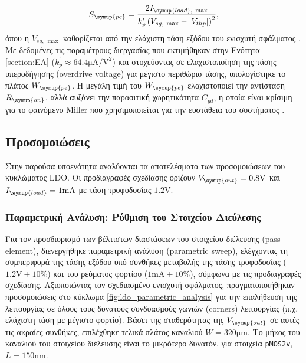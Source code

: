 \begin{equation}
    S_{\symup{pe}} = \frac{2 I_{\symup{load},\ \max}}{k_{p}^{\prime} \left(V_{sg,\ \max} - |V_{thp}|\right)^2},
\end{equation}
όπου η $V_{sg,\ \max}$ καθορίζεται από την ελάχιστη τάση εξόδου του ενισχυτή σφάλματος \cite{RazaviCMOS}. Με δεδομένες τις παραμέτρους διεργασίας που εκτιμήθηκαν στην Ενότητα \ref{section:EA} ($k_{p}^{\prime} \approx 64.4\unit{\micro\ampere\per\volt\squared}$) και στοχεύοντας σε ελαχιστοποίηση της τάσης υπεροδήγησης (overdrive voltage) για μέγιστο περιθώριο τάσης, υπολογίστηκε το πλάτος $W_{\symup{pe}}$. Η μεγάλη τιμή του $W_{\symup{pe}}$ ελαχιστοποιεί την αντίσταση $R_{\symup{on}}$, αλλά αυξάνει την παρασιτική χωρητικότητα $C_{gd}$, η οποία είναι κρίσιμη για το φαινόμενο Miller που χρησιμοποιείται για την ευστάθεια του συστήματος \cite{Maloberti}.

\subsection{Προσομοιώσεις}

Στην παρούσα υποενότητα αναλύονται τα αποτελέσματα των προσομοιώσεων του κυκλώματος LDO. Οι προδιαγραφές σχεδίασης ορίζουν $V_{\symup{out}} = 0.8\unit{\volt}$ και $I_{\symup{load}} = 1\unit{\milli\ampere}$ με τάση τροφοδοσίας $1.2\unit{\volt}$.

\subsubsection{Παραμετρική Ανάλυση: Ρύθμιση του Στοιχείου Διεύλεσης}
Για τον προσδιορισμό των βέλτιστων διαστάσεων του στοιχείου διέλευσης (pass element), διενεργήθηκε παραμετρική ανάλυση (parametric sweep), ελέγχοντας τη συμπεριφορά της τάσης εξόδου υπό συνθήκες μεταβολής της τάσης τροφοδοσίας ($1.2\unit{\volt} \pm 10\%$) και του ρεύματος φορτίου ($1\unit{\milli\ampere} \pm 10\%$), σύμφωνα με τις προδιαγραφές σχεδίασης. Αξιοποιώντας τον σχεδιασμένο ενισχυτή σφάλματος, πραγματοποιήθηκαν προσομοιώσεις στο κύκλωμα \ref{fig:ldo_parametric_analysis} για την επαλήθευση της λειτουργίας σε όλους τους δυνατούς συνδυασμούς γωνιών (corners) λειτουργίας (π.χ. ελάχιστη τάση με μέγιστο φορτίο). Βάσει της σταθερότητας της $V_{\symup{out}}$ σε αυτές τις ακραίες συνθήκες, επιλέχθηκε τελικά πλάτος καναλιού $W = 320\unit{\micro\meter}$. Το μήκος του καναλιού του στοιχείου διέλευσης είναι το μικρότερο δυνατόν, για στοιχεία \texttt{pMOS2v}, $L=150\unit{\nano\meter}$.\par

